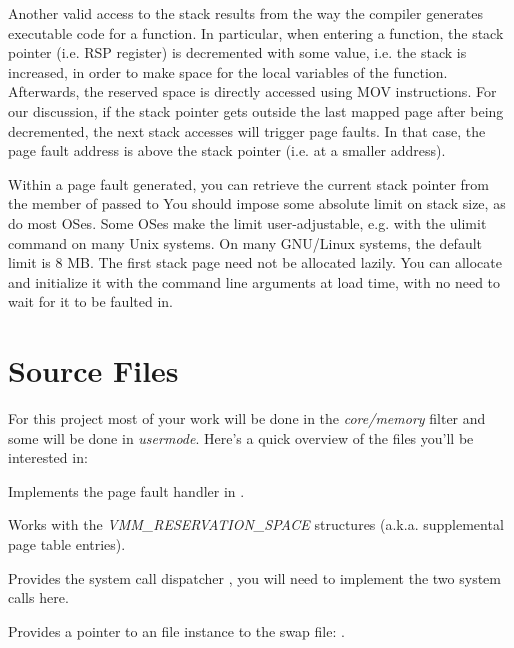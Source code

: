 Another valid access to the stack results from the way the compiler generates executable code for a function. In particular, when entering a function, the stack pointer (i.e. RSP register) is decremented with some value, i.e. the stack is increased, in order to make space for the local variables of the function. Afterwards, the reserved space is directly accessed using MOV instructions. For our discussion, if the stack pointer gets outside the last mapped page after being decremented, the next stack accesses will trigger page faults. In that case, the page fault address is above the stack pointer (i.e. at a smaller address). 

Within a page fault generated, you can retrieve the current stack pointer from the  member of  passed to  You should impose some absolute limit on stack size, as do most OSes.  Some OSes make the limit user-adjustable, e.g. with the ulimit command on many Unix systems.  On many GNU/Linux systems, the default limit is 8 MB. The first stack page need not be allocated lazily. You can allocate and initialize it with the command line arguments at load time, with no need to wait for it to be faulted in.


\section{Source Files}

For this project most of your work will be done in the \textit{core/memory} filter and some will
be done in \textit{usermode}. Here's a quick overview of the files you'll be interested in:


Implements the page fault handler in .


Works with the \textit{VMM\_RESERVATION\_SPACE} structures (a.k.a. supplemental page table entries).


Provides the system call dispatcher , you will need to implement the two system
calls here.


Provides a pointer to an file instance to the swap file: .


